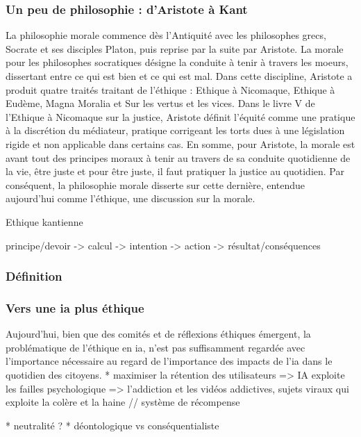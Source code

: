 \pagebreak

\subsubsection{Un peu de philosophie : d'Aristote à Kant}

La philosophie morale commence dès l'Antiquité avec les philosophes grecs, Socrate et ses disciples Platon, puis reprise par la suite par Aristote. La morale pour les philosophes socratiques désigne la conduite à tenir à travers les moeurs, dissertant entre ce qui est bien et ce qui est mal. Dans cette discipline, Aristote a produit quatre traités traitant de l'éthique : Ethique à Nicomaque, Ethique à Eudème, Magna Moralia et Sur les vertus et les vices. Dans le livre V de l'Ethique à Nicomaque sur la justice, Aristote définit l'équité comme une pratique à la discrétion du médiateur, pratique corrigeant les torts dues à une législation rigide et non applicable dans certains cas. En somme, pour Aristote, la morale est avant tout des principes moraux à tenir au travers de sa conduite quotidienne de la vie, être juste et pour être juste, il faut pratiquer la justice au quotidien. Par conséquent, la philosophie morale disserte sur cette dernière, entendue aujourd'hui comme l'éthique, une discussion sur la morale.


Ethique kantienne


principe/devoir -> calcul -> intention -> action -> résultat/conséquences
\subsubsection{Définition}

\cite{ethique-cnil}
\subsubsection{Vers une \gls{ia} plus éthique}

Aujourd'hui, bien que des comités et de réflexions éthiques émergent, la problématique de l'éthique en \gls{ia}, n'est pas suffisamment regardée avec l'importance nécessaire au regard de l'importance des impacts de l'\gls{ia} dans le quotidien des citoyens.
* maximiser la rétention des utilisateurs => IA exploite les failles psychologique => l'addiction et les vidéos addictives, sujets viraux qui exploite la colère et la haine // système de récompense

* neutralité ?
* déontologique vs conséquentialiste